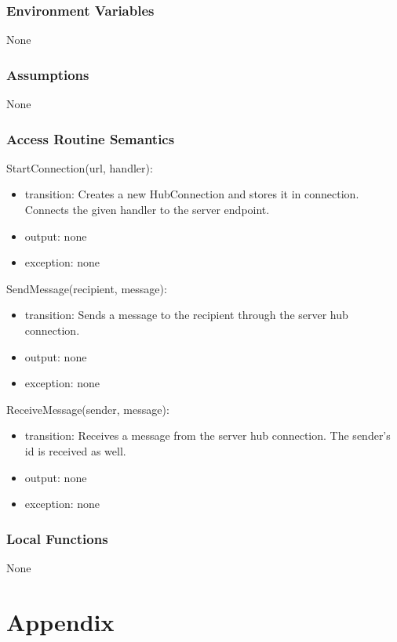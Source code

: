 \documentclass[12pt, titlepage]{article}
\begin{document}
\subsubsection{Environment Variables}

None

\subsubsection{Assumptions}

None

\subsubsection{Access Routine Semantics}

\noindent StartConnection(url, handler):
\begin{itemize}
\item transition: Creates a new HubConnection and stores it in connection. Connects the given handler to the server endpoint.
\item output: none
\item exception: none
\end{itemize}

\noindent SendMessage(recipient, message):
\begin{itemize}
\item transition: Sends a message to the recipient through the server hub connection.
\item output: none
\item exception: none
\end{itemize}

\noindent ReceiveMessage(sender, message):
\begin{itemize}
\item transition: Receives a message from the server hub connection. The sender's id is received as well.
\item output: none
\item exception: none
\end{itemize}

\subsubsection{Local Functions}

None

\newpage

\section{Appendix} \label{Appendix}
\end{document}
